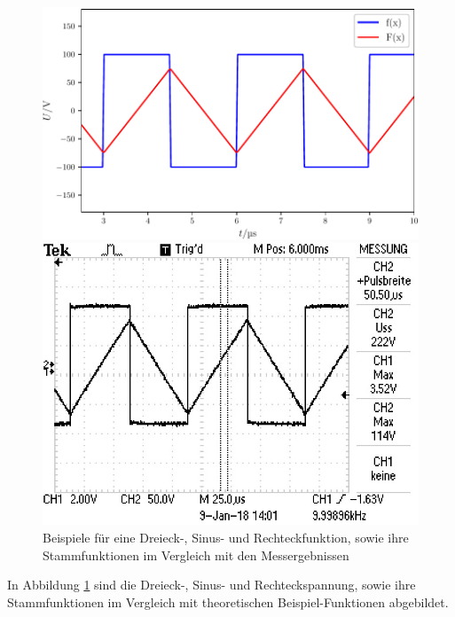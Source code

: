 \begin{figure}
\vspace{2em}
\begin{minipage}{.48\textwidth}
\centering
\includegraphics[width=\linewidth-10pt,height=\textheight-10pt,keepaspectratio]{content/images/Graph7.pdf}
\end{minipage}
\begin{minipage}{0.48\textwidth}
\centering
\includegraphics[width=\linewidth-10pt,height=\textheight-10pt,keepaspectratio]{content/images/7.jpg}
\end{minipage}
\caption{Beispiele für eine Dreieck-, Sinus- und Rechteckfunktion, sowie ihre Stammfunktionen im Vergleich mit den Messergebnissen}
\label{fig:U}
\end{figure}

In Abbildung \ref{fig:U} sind die Dreieck-, Sinus- und Rechteckspannung, sowie ihre Stammfunktionen im Vergleich mit theoretischen Beispiel-Funktionen abgebildet.